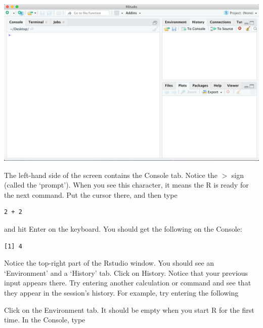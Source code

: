 \begin{center}\includegraphics[width=0.7\linewidth]{images/RstudioMain} \end{center}

The left-hand side of the screen contains the Console tab. Notice the \(>\) sign (called the `prompt'). When you see this character, it means the R is ready for the next command. Put the cursor there, and then type

\begin{verbatim}
2 + 2
\end{verbatim}

and hit Enter on the keyboard. You should get the following on the Console:

\begin{verbatim}
[1] 4
\end{verbatim}

Notice the top-right part of the Rstudio window. You should see an `Environment' and a `History' tab. Click on History. Notice that your previous input appears there. Try entering another calculation or command and see that they appear in the session's history. For example, try entering the following

\begin{Shaded}
\begin{Highlighting}[]
 \SpecialCharTok{\^{}} 
\NormalTok{()}
\end{Highlighting}
\end{Shaded}

Click on the Environment tab. It should be empty when you start R for the first time. In the Console, type

\begin{Shaded}
\begin{Highlighting}[]
\OtherTok{\textless{}{-}} \NormalTok{(}\NormalTok{)}
\end{Highlighting}
\end{Shaded}

